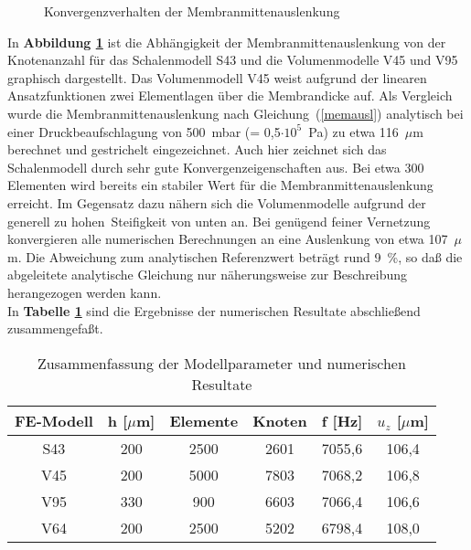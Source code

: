 \begin{figure}[htb]
\begin{center}

\setabbvze
\end{center}
\caption{\label{abbkonvausl}
 Konvergenzverhalten der Membranmittenauslenkung}
\end{figure}
In {\bf Abbildung \ref{abbkonvausl}} ist die Abhängigkeit der
Membranmittenauslenkung von der
Knotenanzahl für das Schalenmodell S43 und die Volumenmodelle
V45 und V95 graphisch dargestellt. Das Volumenmodell V45 weist
aufgrund der linearen Ansatzfunktionen zwei Elementlagen über
die Membrandicke auf. Als Vergleich wurde die Membranmittenauslenkung
nach Gleichung~(\ref{memausl}) analytisch bei einer Druckbeaufschlagung
von 500~mbar (= 0,5$\cdot 10^{5}$~Pa) zu etwa 116~$\mu$m berechnet und
gestrichelt eingezeichnet. Auch hier zeichnet sich das Schalenmodell
durch sehr gute Konvergenzeigenschaften aus. Bei etwa 300 Elementen wird
bereits ein stabiler Wert für die Membranmittenauslenkung
erreicht. Im Gegensatz dazu nähern sich die Volumenmodelle
aufgrund der generell zu \glqq hohen\grqq \, Steifigkeit von
unten an. Bei genügend feiner Vernetzung konvergieren alle numerischen
Berechnungen an eine Auslenkung von etwa 107~$\mu$m. Die Abweichung
zum analytischen Referenzwert beträgt rund 9~\%, so daß die abgeleitete
analytische Gleichung nur näherungsweise zur Beschreibung herangezogen
werden kann.\\
%
In {\bf Tabelle \ref{tabfreqzus}} sind die Ergebnisse der numerischen
Resultate abschließend zusammengefaßt.
\begin{table}[htb]
\caption{\label{tabfreqzus}
 Zusammenfassung der Modellparameter und numerischen Resultate}
\begin{center}
\begin{tabular} {|c||c|c|c||c|c|}
\hline
FE-Modell & h [$\mu$m] & Elemente & Knoten & f [Hz] & $u_{z}$ [$\mu$m] \\
\hline \hline
S43  & 200 &  2500  & 2601  & 7055,6  & 106,4 \\
V45  & 200 &  5000  & 7803  & 7068,2  & 106,8 \\
V95  & 330 &  900   & 6603  & 7066,4  & 106,6 \\
\hline
V64  & 200 &  2500  & 5202  & 6798,4  & 108,0 \\
\hline
\end{tabular}\\
\end{center}
\end{table}

